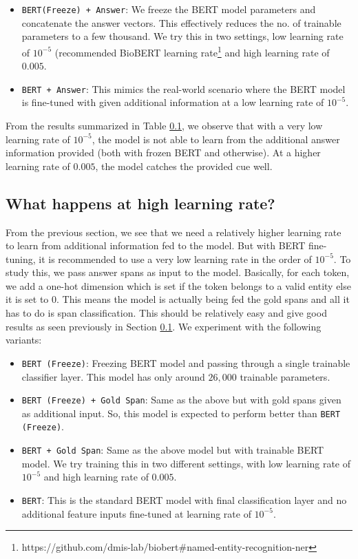 \begin{itemize}
    \item \texttt{BERT(Freeze) + Answer}: We freeze the BERT model parameters and concatenate the answer vectors. This effectively reduces the no. of trainable parameters to a few thousand. We try this in two settings, low learning rate of $10^{-5}$ (recommended BioBERT learning rate\footnote{https://github.com/dmis-lab/biobert\#named-entity-recognition-ner} and high learning rate of $0.005$.
    
    \item \texttt{BERT + Answer}: This mimics the real-world scenario where the BERT model is fine-tuned with given additional information at a low learning rate of $10^{-5}$.
\end{itemize}

From the results summarized in Table \ref{}, we observe that with a very low learning rate of $10^{-5}$, the model is not able to learn from the additional answer information provided (both with frozen BERT and otherwise). At a higher learning rate of $0.005$, the model catches the provided cue well.

\subsection{What happens at high learning rate?}

From the previous section, we see that we need a relatively higher learning rate to learn from additional information fed to the model. But with BERT fine-tuning, it is recommended to use a very low learning rate in the order of $10^{-5}$. To study this, we pass answer spans as input to the model. Basically, for each token, we add a one-hot dimension which is set if the token belongs to a valid entity else it is set to $0$. This means the model is actually being fed the gold spans and all it has to do is span classification. This should be relatively easy and give good results as seen previously in Section \ref{}. We experiment with the following variants:

\begin{itemize}
    \item \texttt{BERT (Freeze)}: Freezing BERT model and passing through a single trainable classifier layer. This model has only around $26,000$ trainable parameters. 
    
    \item \texttt{BERT (Freeze) + Gold Span}: Same as the above but with gold spans given as additional input. So, this model is expected to perform better than \texttt{BERT (Freeze)}.
    
    \item \texttt{BERT + Gold Span}: Same as the above model but with trainable BERT model. We try training this in two different settings, with low learning rate of $10^{-5}$ and high learning rate of $0.005$.
    
    \item \texttt{BERT}: This is the standard BERT model with final classification layer and no additional feature inputs fine-tuned at learning rate of $10^{-5}$.
\end{itemize}

